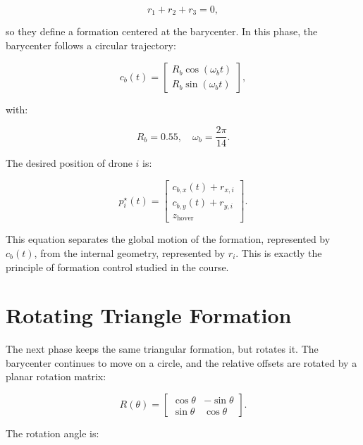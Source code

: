 \begin{equation}
    r_1+r_2+r_3=0,
\end{equation}

so they define a formation centered at the barycenter. In this phase, the barycenter follows a circular trajectory:

\begin{equation}
    c_b(t)=
    \begin{bmatrix}
    R_b\cos(\omega_b t) \\
    R_b\sin(\omega_b t)
    \end{bmatrix},
\end{equation}

with:

\begin{equation}
    R_b=0.55, \quad \omega_b=\frac{2\pi}{14}.
\end{equation}

The desired position of drone $i$ is:

\begin{equation}
    p_i^{\star}(t)=
    \begin{bmatrix}
    c_{b,x}(t)+r_{x,i} \\
    c_{b,y}(t)+r_{y,i} \\
    z_{\text{hover}}
    \end{bmatrix}.
\end{equation}

This equation separates the global motion of the formation, represented by $c_b(t)$, from the internal geometry, represented by $r_i$. This is exactly the principle of formation control studied in the course.

\section{Rotating Triangle Formation}

The next phase keeps the same triangular formation, but rotates it. The barycenter continues to move on a circle, and the relative offsets are rotated by a planar rotation matrix:

\begin{equation}
    R(\theta)=
    \begin{bmatrix}
    \cos\theta & -\sin\theta \\
    \sin\theta & \cos\theta
    \end{bmatrix}.
\end{equation}

The rotation angle is:

